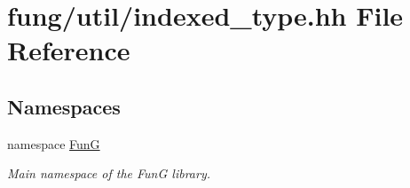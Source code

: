 \hypertarget{indexed__type_8hh}{\section{fung/util/indexed\-\_\-type.hh \-File \-Reference}
\label{indexed__type_8hh}
}
\subsection*{\-Namespaces}
\begin{DoxyCompactItemize}
\item 
namespace \hyperlink{namespaceFunG}{\-Fun\-G}
\begin{DoxyCompactList}\small\item\em \-Main namespace of the \-Fun\-G library. \end{DoxyCompactList}\end{DoxyCompactItemize}
